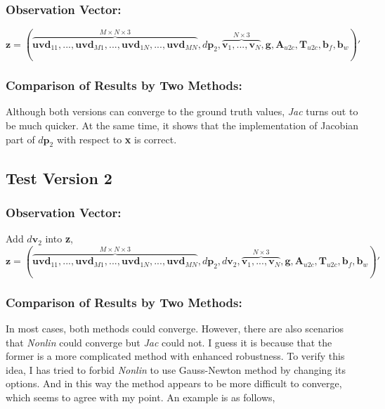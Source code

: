 \documentclass[12pt]{article}   %
\newcounter{case}
\begin{document}
\subsubsection{Observation Vector:}
$$\textbf{z} = (\overbrace{\textbf{uvd}_{11}, ... , \textbf{uvd}_{M1}, ..., \textbf{uvd}_{1N}, ... , \textbf{uvd}_{MN}}^{M \times N \times 3}, d\textbf{p}_2, \overbrace{\textbf{v}_1, ..., \textbf{v}_{N}}^{N \times 3},  \textbf{g}, \textbf{A}_{u2c}, \textbf{T}_{u2c}, \textbf{b}_f, \textbf{b}_w)' $$

\subsubsection{Comparison of Results by Two Methods:}

Although both versions can converge to the ground truth values, \textit{Jac} turns out to be much quicker. At the same time, it shows that the implementation of Jacobian part of $d\textbf{p}_2$ with respect to \textbf{x} is correct.

\subsection{Test Version 2}
\subsubsection{Observation Vector:}
Add $d\textbf{v}_2$ into \textbf{z},
$$\textbf{z} = (\overbrace{\textbf{uvd}_{11}, ... , \textbf{uvd}_{M1}, ..., \textbf{uvd}_{1N}, ... , \textbf{uvd}_{MN}}^{M \times N \times 3}, d\textbf{p}_2, d\textbf{v}_2, \overbrace{\textbf{v}_1, ..., \textbf{v}_{N}}^{N \times 3},  \textbf{g}, \textbf{A}_{u2c}, \textbf{T}_{u2c}, \textbf{b}_f, \textbf{b}_w)' $$

\subsubsection{Comparison of Results by Two Methods:}

In most cases, both methods could converge. However, there are also scenarios that \textit{Nonlin} could converge but \textit{Jac} could not. I guess it is because that the former is a more complicated method with enhanced robustness. To verify this idea, I has tried to forbid \textit{Nonlin} to use Gauss-Newton method by changing its options. And in this way the method appears to be more difficult to converge, which seems to agree with my point. An example is as follows,
\end{document}
